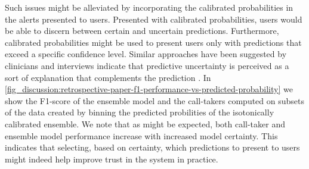 Such issues might be alleviated by incorporating the calibrated probabilities in the alerts presented to users. Presented with calibrated probabilities, users would be able to discern between certain and uncertain predictions. Furthermore, calibrated probabilities might be used to present users only with predictions that exceed a specific confidence level. Similar approaches have been suggested by clinicians and interviews indicate that predictive uncertainty is perceived as a sort of explanation that complements the prediction \cite{tonekaboni_what_2019}. In \cref{fig_discussion:retrospective-paper-f1-performance-vs-predicted-probability} we show the F1-score of the ensemble model and the call-takers computed on subsets of the data created by binning the predicted probilities of the isotonically calibrated ensemble. We note that as might be expected, both call-taker and ensemble model performance increase with increased model certainty. This indicates that selecting, based on certainty, which predictions to present to users might indeed help improve trust in the system in practice. 

